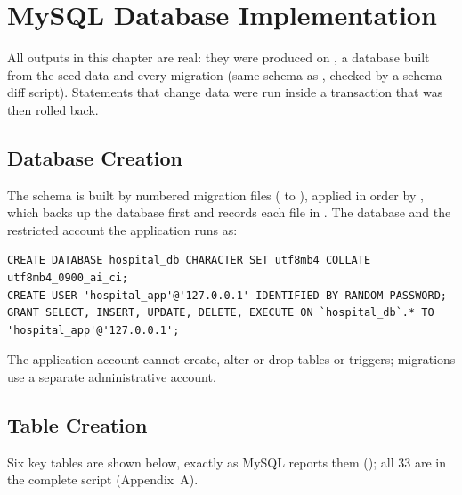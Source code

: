 \chapter{MySQL Database Implementation}
All outputs in this chapter are real: they were produced on , a database built from the seed
data and every migration (same schema as , checked by a schema-diff script). Statements that change
data were run inside a transaction that was then rolled back.

\section{Database Creation}
The schema is built by numbered migration files ( to ), applied in order by
, which backs up the database first and records each file in
. The database and the restricted account the application runs as:
\begin{lstlisting}[caption={Creating the database and the application's restricted account}]
CREATE DATABASE hospital_db CHARACTER SET utf8mb4 COLLATE utf8mb4_0900_ai_ci;
CREATE USER 'hospital_app'@'127.0.0.1' IDENTIFIED BY RANDOM PASSWORD;
GRANT SELECT, INSERT, UPDATE, DELETE, EXECUTE ON `hospital_db`.* TO 'hospital_app'@'127.0.0.1';
\end{lstlisting}
The application account cannot create, alter or drop tables or triggers; migrations use a separate administrative account.

\section{Table Creation}
Six key tables are shown below, exactly as MySQL reports them (); all 33 are in the complete
script (Appendix~A).








